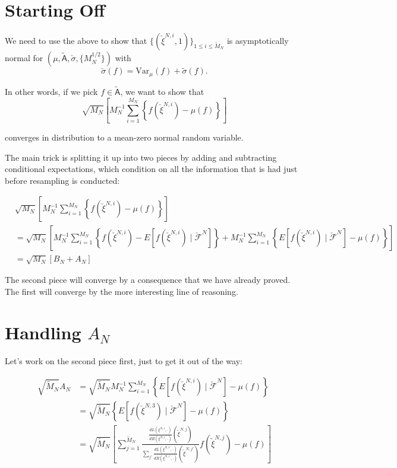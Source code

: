 \documentclass{article}
\begin{document}
\section{Starting Off}

We need to use the above to show that 
$\{ ( \check{\xi}^{N,i}, 1 )\}_{1 \le i \le \tilde{M}_N}$ is asymptotically normal for $(\mu, \tilde{\mathsf{A}}, \check{\sigma}, \{M_N^{1/2}\})$ with 
$$
\check{\sigma}(f) = 
\text{Var}_{\mu}(f) + \tilde{\sigma}(f) .
$$



In other words, if we pick $f\in \tilde{\mathsf{A}}$, we want to show that 
$$
\sqrt{M_N} \left[ M_N^{-1}\sum_{i=1}^{M_N} \left\{  f(\check{\xi}^{N,i}) - \mu(f) \right\}    \right]
$$

converges in distribution to a mean-zero normal random variable. 

The main trick is splitting it up into two pieces by adding and subtracting conditional expectations, which condition on all the information that is had just before resampling is conducted:

\begin{align*}
&\sqrt{M_N} \left[ M_N^{-1}\sum_{i=1}^{M_N} \left\{  f(\check{\xi}^{N,i}) - \mu(f) \right\}    \right] \\
&= \sqrt{M_N} \left[ M_N^{-1} \sum_{i=1}^{M_N} \left\{  f(\check{\xi}^{N,i}) - E[f(\check{\xi}^{N,i}) \mid \check{\mathcal{F}}^N] \right\} + M_N^{-1}\sum_{i=1}^{M_N} \left\{  E[f(\check{\xi}^{N,i}) \mid \check{\mathcal{F}}^N] - \mu(f) \right\}    \right] \\
&= \sqrt{M_N} \left[ B_N + A_N    \right]
\end{align*}

The second piece will converge by a consequence that we have already proved. The first will converge by the more interesting line of reasoning.

\section{Handling $A_N$}

Let's work on the second piece first, just to get it out of the way:

\begin{align*}
\sqrt{\tilde{M}_N}A_N &= 
\sqrt{\tilde{M}_N} M_N^{-1}\sum_{i=1}^{M_N} \left\{  E[f(\check{\xi}^{N,i}) \mid \check{\mathcal{F}}^N] - \mu(f) \right\}   \\
&=   \sqrt{\tilde{M}_N}\left\{ E[f(\check{\xi}^{N,3}) \mid \check{\mathcal{F}}^N] - \mu(f)\right\} \tag{identicalness}\\
&= \sqrt{\tilde{M}_N}\left[ \sum_{j=1}^{\tilde{M}_N} \frac{ \frac{dL(\xi^{N,i}, \cdot)}{dR(\xi^{N,i}, \cdot)}(\tilde{\xi}^{N,j})  }{ \sum_{j'} \frac{dL(\xi^{N,i'}, \cdot)}{dR(\xi^{N,i'}, \cdot)}(\tilde{\xi}^{N,j'}) } f( \tilde{\xi}^{N,j})  - \mu(f) \right]
\end{align*}
\end{document}

